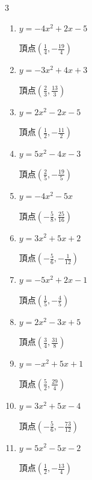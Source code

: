 \begin{multicols}{3}
\begin{enumerate}
  \item $\displaystyle y=-4x^{2}+2x-5$

        $\displaystyle 頂点\left( \frac{1}{4} , -\frac{19}{4} \right)$

  \item $\displaystyle y=-3x^{2}+4x+3$

        $\displaystyle 頂点\left( \frac{2}{3} , \frac{13}{3} \right)$

  \item $\displaystyle y=2x^{2}-2x-5$

        $\displaystyle 頂点\left( \frac{1}{2} , -\frac{11}{2} \right)$

  \item $\displaystyle y=5x^{2}-4x-3$

        $\displaystyle 頂点\left( \frac{2}{5} , -\frac{19}{5} \right)$

  \item $\displaystyle y=-4x^{2}-5x$

        $\displaystyle 頂点\left( -\frac{5}{8} , \frac{25}{16} \right)$

\columnbreak %

  \item $\displaystyle y=3x^{2}+5x+2$

        $\displaystyle 頂点\left( -\frac{5}{6} , -\frac{1}{12} \right)$

  \item $\displaystyle y=-5x^{2}+2x-1$

        $\displaystyle 頂点\left( \frac{1}{5} , -\frac{4}{5} \right)$

  \item $\displaystyle y=2x^{2}-3x+5$

        $\displaystyle 頂点\left( \frac{3}{4} , \frac{31}{8} \right)$

  \item $\displaystyle y=-x^{2}+5x+1$

        $\displaystyle 頂点\left( \frac{5}{2} , \frac{29}{4} \right)$

  \item $\displaystyle y=3x^{2}+5x-4$

        $\displaystyle 頂点\left( -\frac{5}{6} , -\frac{73}{12} \right)$

\columnbreak %

  \item $\displaystyle y=5x^{2}-5x-2$

        $\displaystyle 頂点\left( \frac{1}{2} , -\frac{13}{4} \right)$


\end{enumerate}
\end{multicols}
